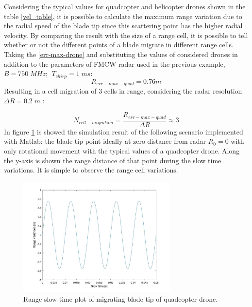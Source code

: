 Considering the typical values for quadcopter and helicopter drones shown in the table \ref{vel_table}, it is possible to calculate the maximum range variation due to the radial speed of the blade tip since this scattering point has the higher radial velocity. By comparing the result with the size of a range cell, it is possible to tell whether or not the different points of a blade migrate in different range cells. Taking the \ref{err-max-drone} and substituting the values of considered drones in addition to the parameters of FMCW radar used in the previous example, $B = 750 \;MHz$; $\;T_{chirp} = 1\;ms$:
\begin{equation}
     R_{err-max-quad} =  0.76 m
\end{equation} 
Resulting in a cell migration of 3 cells in range, considering the radar resolution $\Delta R = 0.2\;m$ :

\begin{equation}
 N_{cell-migration} = \frac{ R_{err-max-quad}}{\Delta R} \approx 3
\end{equation}
In figure \ref{range-slow-time-migration-quad} is showed the simulation result of the following scenario implemented with Matlab: the blade tip point ideally at zero distance from radar $R_{0} = 0$ with only rotational movement with the typical values of a quadcopter drone. Along the y-axis is shown the range distance of that point during the slow time variations. It is simple to observe the range cell variations.
\begin{figure}[h!]
    \centering
    \includegraphics[width=8cm]{Time-frequency analysis-chap3/img/quad_range-slow_time_plot_migration.jpg}
    \caption{Range slow time plot of migrating blade tip of quadcopter drone.}
    \label{range-slow-time-migration-quad}
\end{figure}

